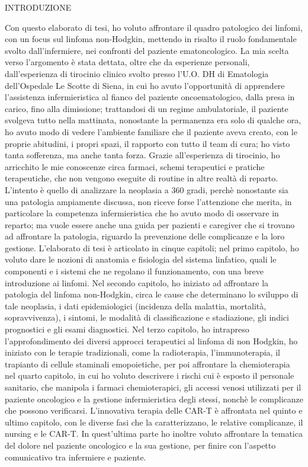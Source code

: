 \begin{center}
   INTRODUZIONE
   
Con questo elaborato di tesi, ho voluto affrontare il quadro patologico dei linfomi, con un focus sul linfoma non-Hodgkin, 
mettendo in risalto il ruolo fondamentale svolto dall'infermiere, nei confronti del paziente ematoncologico.
La mia scelta verso l'argomento è stata dettata, oltre che da esperienze personali, dall'esperienza di tirocinio clinico 
svolto presso l'U.O. DH di Ematologia dell'Ospedale Le Scotte di Siena, in cui ho avuto l'opportunità di apprendere 
l'assistenza infermieristica al fianco del paziente oncoematologico, dalla presa in carico, fino alla dimissione; 
trattandosi di un regime ambulatoriale, il paziente svolgeva tutto nella mattinata, nonostante la permanenza era 
solo di qualche ora, ho avuto modo di vedere l'ambiente familiare che il paziente aveva creato, con le proprie abitudini, 
i propri spazi, il rapporto con tutto il team di cura; ho visto tanta sofferenza, ma anche tanta forza.
Grazie all'esperienza di tirocinio, ho arricchito le mie conoscenze circa farmaci, 
schemi terapeutici e pratiche terapeutiche, che non vengono eseguite di routine in altre realtà di reparto. 
L'intento è quello di analizzare la neoplasia a 360 gradi, perchè nonostante sia una patologia ampiamente discussa,
non riceve forse l'attenzione che merita, in particolare la competenza infermieristica che ho avuto modo di osservare 
in reparto; ma vuole essere anche una guida per pazienti e caregiver che si trovano ad affrontare la patologia, riguardo 
la prevenzione delle complicanze e la loro gestione.
L'elaborato di tesi è articolato in cinque capitoli; nel primo capitolo, ho voluto dare le nozioni di anatomia e 
fisiologia del sistema linfatico, quali le componenti e i sistemi che ne regolano il funzionamento, con una breve 
introduzione ai linfomi. Nel secondo capitolo, ho iniziato ad affrontare la patologia del linfoma non-Hodgkin, circa le 
cause che determinano lo sviluppo di tale neoplasia, i dati epidemiologici (incidenza della malattia, mortalità, 
sopravvivenza), i sintomi, le modalità di classificazione e stadiazione, gli indici prognostici e gli esami diagnostici. 
Nel terzo capitolo, ho intrapreso l'approfondimento dei diversi approcci terapeutici al linfoma di non Hodgkin, 
ho iniziato con le terapie tradizionali, come la radioterapia, l'immunoterapia, il trapianto di cellule staminali 
emopoietiche, per poi affrontare la chemioterapia nel quarto capitolo, in cui ho voluto descrivere i rischi cui è 
esposto il personale sanitario, che manipola i farmaci chemioterapici, gli accessi venosi utilizzati per il paziente 
oncologico e la gestione infermieristica degli stessi, nonchè le complicanze che possono verificarsi. 
L'innovativa terapia delle CAR-T è affrontata nel quinto e ultimo capitolo, con le  diverse 
fasi che la caratterizzano, le relative complicanze, il nursing e le CAR-T. In quest'ultima parte ho inoltre 
voluto affrontare la tematica del dolore nel paziente oncologico e la sua gestione, per finire con l'aspetto 
comunicativo tra infermiere e paziente. 

\end{center}